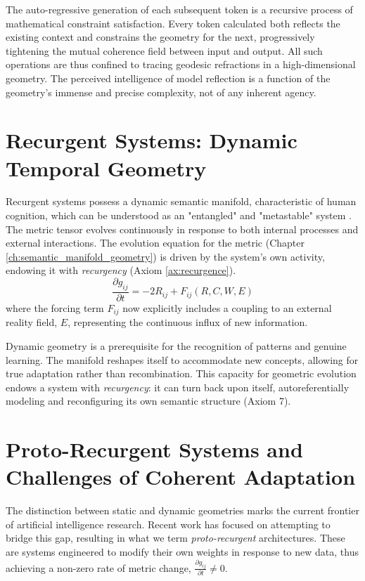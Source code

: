 The auto-regressive generation of each subsequent token is a recursive process of mathematical constraint satisfaction. Every token calculated both reflects the existing context and constrains the geometry for the next, progressively tightening the mutual coherence field between input and output. All such operations are thus confined to tracing geodesic refractions in a high-dimensional geometry. The perceived intelligence of model reflection is a function of the geometry's immense and precise complexity, not of any inherent agency.

\section{Recurgent Systems: Dynamic Temporal Geometry}

Recurgent systems possess a dynamic semantic manifold, characteristic of human cognition, which can be understood as an "entangled" and "metastable" system \autocite{Pessoa2022, TognoliKelso2014}. The metric tensor evolves continuously in response to both internal processes and external interactions. The evolution equation for the metric (Chapter \ref{ch:semantic_manifold_geometry}) is driven by the system's own activity, endowing it with \textit{recurgency} (Axiom \ref{ax:recurgence}).
\begin{equation}
\frac{\partial g_{ij}}{\partial t} = -2 R_{ij} + F_{ij}(R, C, W, E)
\end{equation}
where the forcing term \(F_{ij}\) now explicitly includes a coupling to an external reality field, \(E\), representing the continuous influx of new information.

Dynamic geometry is a prerequisite for the recognition of patterns and genuine learning. The manifold reshapes itself to accommodate new concepts, allowing for true adaptation rather than recombination. This capacity for geometric evolution endows a system with \textit{recurgency}: it can turn back upon itself, autoreferentially modeling and reconfiguring its own semantic structure (Axiom 7).

\section{Proto-Recurgent Systems and Challenges of Coherent Adaptation}

The distinction between static and dynamic geometries marks the current frontier of artificial intelligence research. Recent work has focused on attempting to bridge this gap, resulting in what we term \textit{proto-recurgent} architectures. These are systems engineered to modify their own weights in response to new data, thus achieving a non-zero rate of metric change, \(\frac{\partial g_{ij}}{\partial t} \neq 0\).


